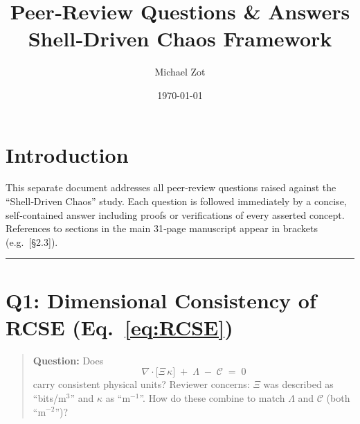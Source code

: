 \documentclass[11pt]{article}
\title{Peer‐Review Questions \& Answers\\[0.5em]
\large Shell‐Driven Chaos Framework}
\author{Michael Zot}
\date{\today}
\begin{document}
\maketitle

\section*{Introduction}
This separate document addresses all peer‐review questions raised against the ``Shell‐Driven Chaos'' study. Each question is followed immediately by a concise, self‐contained answer including proofs or verifications of every asserted concept. References to sections in the main 31‐page manuscript appear in brackets (e.g.\ [§2.3]).

\bigskip\hrule\bigskip

\section*{Q1: Dimensional Consistency of RCSE (Eq.~\eqref{eq:RCSE})}
\begin{quote}
\textbf{Question:} Does 
\[
  \nabla\!\cdot\!\bigl[\Xi\,\kappa\bigr] \;+\;\Lambda \;-\;\mathcal C \;=\;0
\]
carry consistent physical units? Reviewer concerns: $\Xi$ was described as ``bits/m$^3$'' and $\kappa$ as ``m$^{-1}$''. How do these combine to match $\Lambda$ and $\mathcal C$ (both ``m$^{-2}$'')?
\end{quote}
\end{document}
